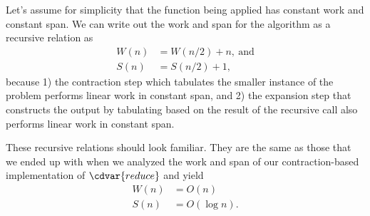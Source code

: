 \begin{cluster}
\label{grp:grm:design::contraction::cost-of-scan-with-contraction}

\begin{gram}
\label{grm:design::contraction::cost-of-scan-with-contraction}
Let's assume for simplicity that the function being applied has
constant work and constant span. We can write out the work and span
for the algorithm as a recursive relation as 
\[ \begin{align*}
W(n) &= W(n/2) + n,~\mbox{and}
\\
S(n) &= S(n/2) + 1,
\end{align*} \]
because 1) the contraction step which tabulates the smaller instance
of the problem performs linear work in constant span, and 2) the
expansion step that constructs the output by tabulating based on the
result of the recursive call also performs linear work in constant
span.

These recursive relations should look familiar.  They are the same as
those that we ended up with when we analyzed the work and span of our
contraction-based implementation of $\cdvar{reduce}$ and  yield 
\[ \begin{align*}
W(n) &= O(n)
\\
S(n) &=  O(\log{n}).
\end{align*} \]

\end{gram}
\end{cluster}

